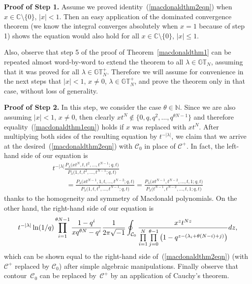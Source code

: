 \documentclass[11pt]{article}
\numberwithin{equation}{section}
\newcommand{\C}{\mathbb{C}}
\newcommand{\N}{\mathbb{N}}
\newcommand{\CC}{\mathcal{C}}
\newcommand{\GT}{\mathbb{GT}}
\newcommand{\GTp}{\mathbb{GT}^+}
\begin{document}
\textbf{Proof of Step 1.} Assume we proved identity~(\ref{macdonaldthm2eqn}) when $x\in\C \setminus \{0\}$, $|x| < 1$. Then an easy application of the dominated convergence theorem (we know the integral converges absolutely when $x = 1$ because of step 1) shows the equation would also hold for all $x\in\C \setminus \{0\}$, $|x|\leq 1$.

Also, observe that step 5 of the proof of Theorem~\ref{macdonaldthm1} can be repeated almost word-by-word to extend the theorem to all $\lambda\in\GT_N$, assuming that it was proved for all $\lambda\in\GTp_N$. Therefore we will assume for convenience in the next steps that $|x| < 1$, $x\neq 0$, $\lambda\in\GTp_N$, and prove the theorem only in that case, without loss of generality.

\textbf{Proof of Step 2.} In this step, we consider the case $\theta\in\N$. Since we are also assuming $|x| < 1$, $x\neq 0$, then clearly $xt^N\notin\big\{0, q, q^2, \dots, q^{\theta N - 1}\big\}$ and therefore equality~(\ref{macdonaldthm1eqn}) holds if $x$ was replaced with $xt^N$. After multiplying both sides of the resulting equation by $t^{-|\lambda|}$, we claim that we arrive at the desired~(\ref{macdonaldthm2eqn}) with $\CC_0$ in place of $\CC^+$. In fact, the left-hand side of our equation is
\begin{gather*}
t^{-|\lambda|}\frac{P_{\lambda}\big(xt^N, t, t^2, \dots, t^{N-1}; q, t\big)}{P_{\lambda}\big(1, t, t^2, \dots, t^{N-1}; q, t\big)} \\
\qquad{} = \frac{P_{\lambda}\big(xt^{N-1}, 1, t, \dots, t^{N-2}; q, t\big)}{P_{\lambda}\big(1, t, t^2, \dots, t^{N-1}; q, t\big)} = \frac{P_{\lambda}\big(xt^{N-1}, t^{N-2}, \dots, t, 1; q, t\big)}{P_{\lambda}\big(t^{N-1}, t^{N-2}, \dots, t, 1; q, t\big)}
\end{gather*}
thanks to the homogeneity and symmetry of Macdonald polynomials. On the other hand, the right-hand side of our equation is
\begin{gather*}
t^{-|\lambda|}\ln(1/q)\prod_{i=1}^{\theta N - 1}{\frac{1 - q^i}{xq^{\theta N} - q^i}}\frac{1}{2\pi\sqrt{-1}}\oint_{\CC_0}{\frac{x^zt^{Nz}}{\prod\limits_{i=1}^N\prod\limits_{j=0}^{\theta -1}{\big(1 - q^{z - (\lambda_i + \theta(N-i) + j)}\big)}}{\rm d}z},
\end{gather*}
which can be shown equal to the right-hand side of~(\ref{macdonaldthm2eqn}) (with $\CC^+$ replaced by $\CC_0$) after simple algebraic manipulations. Finally observe that contour~$\CC_0$ can be replaced by~$\CC^+$ by an application of Cauchy's theorem.
\end{document}
